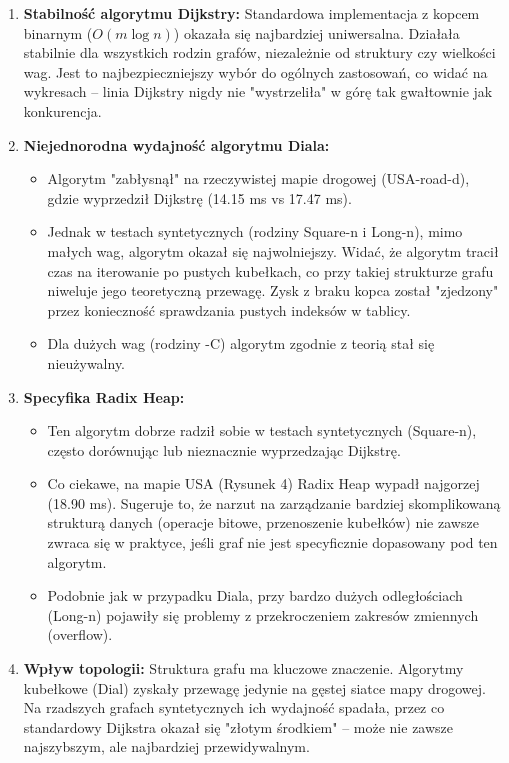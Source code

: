 \documentclass[a4paper,12pt]{article}
\begin{document}
\begin{enumerate}
    \item \textbf{Stabilność algorytmu Dijkstry:} 
    Standardowa implementacja z kopcem binarnym ($O(m \log n)$) okazała się najbardziej uniwersalna. Działała stabilnie dla wszystkich rodzin grafów, niezależnie od struktury czy wielkości wag. Jest to najbezpieczniejszy wybór do ogólnych zastosowań, co widać na wykresach – linia Dijkstry nigdy nie "wystrzeliła" w górę tak gwałtownie jak konkurencja.

    \item \textbf{Niejednorodna wydajność algorytmu Diala:}
    \begin{itemize}
        \item Algorytm "zabłysnął" na rzeczywistej mapie drogowej (USA-road-d), gdzie wyprzedził Dijkstrę (14.15 ms vs 17.47 ms).
        \item Jednak w testach syntetycznych (rodziny Square-n i Long-n), mimo małych wag, algorytm okazał się najwolniejszy. Widać, że algorytm tracił czas na iterowanie po pustych kubełkach, co przy takiej strukturze grafu niweluje jego teoretyczną przewagę. Zysk z braku kopca został "zjedzony" przez konieczność sprawdzania pustych indeksów w tablicy.
        \item Dla dużych wag (rodziny -C) algorytm zgodnie z teorią stał się nieużywalny.
    \end{itemize}

    \item \textbf{Specyfika Radix Heap:}
    \begin{itemize}
        \item Ten algorytm dobrze radził sobie w testach syntetycznych (Square-n), często dorównując lub nieznacznie wyprzedzając Dijkstrę.
        \item Co ciekawe, na mapie USA (Rysunek 4) Radix Heap wypadł najgorzej (18.90 ms). Sugeruje to, że narzut na zarządzanie bardziej skomplikowaną strukturą danych (operacje bitowe, przenoszenie kubełków) nie zawsze zwraca się w praktyce, jeśli graf nie jest specyficznie dopasowany pod ten algorytm.
        \item Podobnie jak w przypadku Diala, przy bardzo dużych odległościach (Long-n) pojawiły się problemy z przekroczeniem zakresów zmiennych (overflow).
    \end{itemize}

    \item \textbf{Wpływ topologii:} 
    Struktura grafu ma kluczowe znaczenie. Algorytmy kubełkowe (Dial) zyskały przewagę jedynie na gęstej siatce mapy drogowej. Na rzadszych grafach syntetycznych ich wydajność spadała, przez co standardowy Dijkstra okazał się "złotym środkiem" – może nie zawsze najszybszym, ale najbardziej przewidywalnym.
\end{enumerate}
\end{document}
